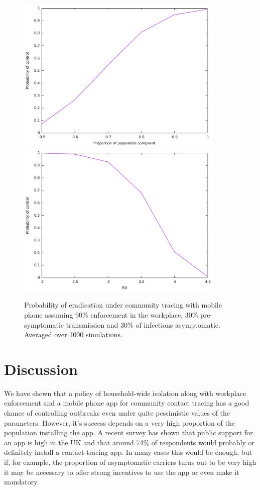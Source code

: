 \documentclass{article}
\begin{document}
\begin{figure}
\begin{center}
\includegraphics[width = 10cm]{mobileTracing30Subclinical30pre.pdf}
\includegraphics[width = 10cm]{mobileTracing30Subclinical30preR0.pdf}
\end{center}
\caption{Probability of eradication under community tracing with mobile phone assuming 90\% enforcement in the workplace, 30\% pre-symptomatic transmission and 30\% of infections asymptomatic. Averaged over 1000 simulations.}
\label{fulltrace30}
\end{figure}

\section{Discussion}

We have shown that a policy of household-wide isolation along with workplace enforcement and a mobile phone app for community contact tracing has a good chance of controlling outbreaks even under quite pessimistic values of the parameters. However, it's success depends on a very high proportion of the population installing the app. A recent survey\cite{abeler2020Support} has shown that public support for an app is high in the UK and that around 74\% of respondents would probably or definitely install a contact-tracing app. In many cases this would be enough, but if, for example, the proportion of asymptomatic carriers turns out to be very high it may be necessary to offer strong incentives to use the app or even make it mandatory.
\end{document}
